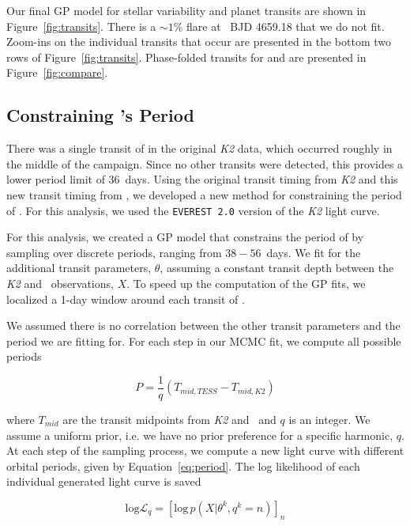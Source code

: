 \documentclass[twocolumn]{aastex631}
\begin{document}
Our final GP model for stellar variability and planet transits are shown in Figure~\ref{fig:transits}. There is a $\sim 1\%$ flare at \tess\ BJD 4659.18 that we do not fit. Zoom-ins on the individual transits that occur are presented in the bottom two rows of Figure~\ref{fig:transits}. Phase-folded transits for \planetc and \planetd are presented in Figure~\ref{fig:compare}.


\subsection{Constraining \planete's Period}

There was a single transit of \planete in the original \textit{K2} data, which occurred roughly in the middle of the campaign. Since no other transits were detected, this provides a lower period limit of 36~days. Using the original transit timing from \textit{K2} and this new transit timing from \tess, we developed a new method for constraining the period of \planete. For this analysis, we used the \texttt{EVEREST 2.0} \citep{luger18} version of the \textit{K2} light curve. 

For this analysis, we created a GP model that constrains the period of \planete by sampling over discrete periods, ranging from $38 - 56$~days. We fit for the additional transit parameters, $\theta$, assuming a constant transit depth between the \textit{K2} and \tess\ observations, $X$. To speed up the computation of the GP fits, we localized a 1-day window around each transit of \planete.  

We assumed there is no correlation between the other transit parameters and the period we are fitting for. For each step in our MCMC fit, we compute all possible periods

\begin{equation}\label{eq:period}
    P = \frac{1}{q} \left(T_{mid,TESS} - T_{mid, K2}\right)
\end{equation}

where $T_{mid}$ are the transit midpoints from \textit{K2} and \tess\ and $q$ is an integer. We assume a uniform prior, i.e. we have no prior preference for a specific harmonic, $q$. At each step of the sampling process, we compute a new light curve with different orbital periods, given by Equation~\ref{eq:period}. The log likelihood of each individual generated light curve is saved

\begin{equation}
    \textrm{log} \mathcal{L}_q = \left[ \textrm{log}\, p \left( X | \theta^k, q^k = n \right) \right]_n
\end{equation}
\end{document}

